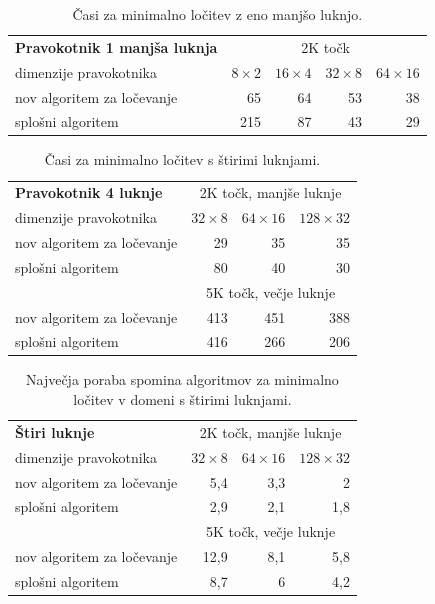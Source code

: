 \documentclass[a4paper, 12pt]{book}
\begin{document}
\begin{table}[htp]
\begin{center}
\begin{tabular}{l*{4}{r}}
\textbf{Pravokotnik 1 manjša luknja} & \multicolumn{4}{c}{2K točk}\\
dimenzije pravokotnika	&	$8\times 2$	&	$16\times 4$	&	$32\times 8$ & $64\times 16$ \\	
\hline
nov algoritem za ločevanje	&	65	&	64	&	53	&	38  \\
splošni algoritem			&	215	&	87	&	43	&	29
\end{tabular}
\caption{Časi za minimalno ločitev z eno manjšo luknjo.}
\label{table6}
\end{center}
\end{table}

\begin{table}[htp]
\begin{center}
\begin{tabular}{l*{3}{r}}
\textbf{Pravokotnik 4 luknje} & \multicolumn{3}{c}{2K točk, manjše luknje} \\
dimenzije pravokotnika	&	$32\times 8$ &	$64\times 16$ & $128\times 32$ \\	
\hline
nov algoritem za ločevanje	&	29	&	35	&	35	\\
splošni algoritem			&	80	&	40	&	30	\\
\hline
& \multicolumn{3}{c}{5K točk, večje luknje} \\
\hline
nov algoritem za ločevanje &	413 & 451 & 388  \\
splošni algoritem &	416 & 266 & 206
\end{tabular}
\caption{Časi za minimalno ločitev s štirimi luknjami.}
\label{table7}
\end{center}
\end{table}

\begin{table}
\begin{center}
\begin{tabular}{l*{3}{r}}
\textbf{Štiri luknje} & \multicolumn{3}{c}{2K točk, manjše luknje}\\						
dimenzije pravokotnika	&	$32\times 8$	&	$64\times 16$	&	$128\times 32$	\\
\hline
nov algoritem za ločevanje	&	5,4	&	3,3	&	2		\\
splošni algoritem	&	2,9	&	2,1	&	1,8	\vspace{.2cm}	\\
\hline
& \multicolumn{3}{c}{5K točk, večje luknje} \\
\hline
nov algoritem za ločevanje	& 12,9	&	8,1	&	5,8		\\
splošni algoritem	&	8,7	&	6	&	4,2	\vspace{.2cm}	\\
\end{tabular}
\caption{Največja poraba spomina algoritmov za minimalno ločitev v domeni s štirimi luknjami.}
\label{table-ram-sep}
\end{center}
\end{table}
\end{document}
